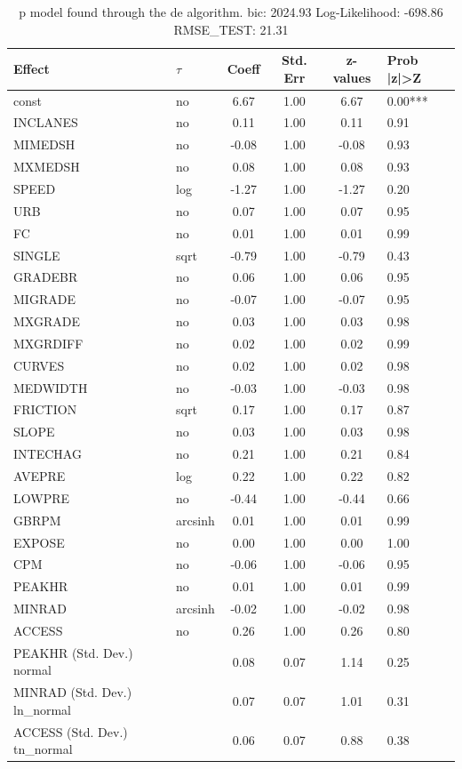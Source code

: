 \begin{table}
	\caption{p model found through the de algorithm. bic: 2024.93 Log-Likelihood: -698.86 RMSE_TEST: 21.31}
	\begin{center}
		\begin{tabular}{|l|l|c|c|c|l|}
			\hline
			Effect & $\tau$ & Coeff & Std. Err & z-values & Prob |z|>Z \\
			\hline
			const & no & 6.67 & 1.00 & 6.67 & 0.00*** \\
			\hline
			INCLANES & no & 0.11 & 1.00 & 0.11 & 0.91 \\
			\hline
			MIMEDSH & no & -0.08 & 1.00 & -0.08 & 0.93 \\
			\hline
			MXMEDSH & no & 0.08 & 1.00 & 0.08 & 0.93 \\
			\hline
			SPEED & log & -1.27 & 1.00 & -1.27 & 0.20 \\
			\hline
			URB & no & 0.07 & 1.00 & 0.07 & 0.95 \\
			\hline
			FC & no & 0.01 & 1.00 & 0.01 & 0.99 \\
			\hline
			SINGLE & sqrt & -0.79 & 1.00 & -0.79 & 0.43 \\
			\hline
			GRADEBR & no & 0.06 & 1.00 & 0.06 & 0.95 \\
			\hline
			MIGRADE & no & -0.07 & 1.00 & -0.07 & 0.95 \\
			\hline
			MXGRADE & no & 0.03 & 1.00 & 0.03 & 0.98 \\
			\hline
			MXGRDIFF & no & 0.02 & 1.00 & 0.02 & 0.99 \\
			\hline
			CURVES & no & 0.02 & 1.00 & 0.02 & 0.98 \\
			\hline
			MEDWIDTH & no & -0.03 & 1.00 & -0.03 & 0.98 \\
			\hline
			FRICTION & sqrt & 0.17 & 1.00 & 0.17 & 0.87 \\
			\hline
			SLOPE & no & 0.03 & 1.00 & 0.03 & 0.98 \\
			\hline
			INTECHAG & no & 0.21 & 1.00 & 0.21 & 0.84 \\
			\hline
			AVEPRE & log & 0.22 & 1.00 & 0.22 & 0.82 \\
			\hline
			LOWPRE & no & -0.44 & 1.00 & -0.44 & 0.66 \\
			\hline
			GBRPM & arcsinh & 0.01 & 1.00 & 0.01 & 0.99 \\
			\hline
			EXPOSE & no & 0.00 & 1.00 & 0.00 & 1.00 \\
			\hline
			CPM & no & -0.06 & 1.00 & -0.06 & 0.95 \\
			\hline
			PEAKHR & no & 0.01 & 1.00 & 0.01 & 0.99 \\
			\hline
			MINRAD & arcsinh & -0.02 & 1.00 & -0.02 & 0.98 \\
			\hline
			ACCESS & no & 0.26 & 1.00 & 0.26 & 0.80 \\
			\hline
			PEAKHR (Std. Dev.) normal &  & 0.08 & 0.07 & 1.14 & 0.25 \\
			\hline
			MINRAD (Std. Dev.) ln_normal &  & 0.07 & 0.07 & 1.01 & 0.31 \\
			\hline
			ACCESS (Std. Dev.) tn_normal &  & 0.06 & 0.07 & 0.88 & 0.38 \\
			\hline
		\end{tabular}
	\end{center}
\end{table}